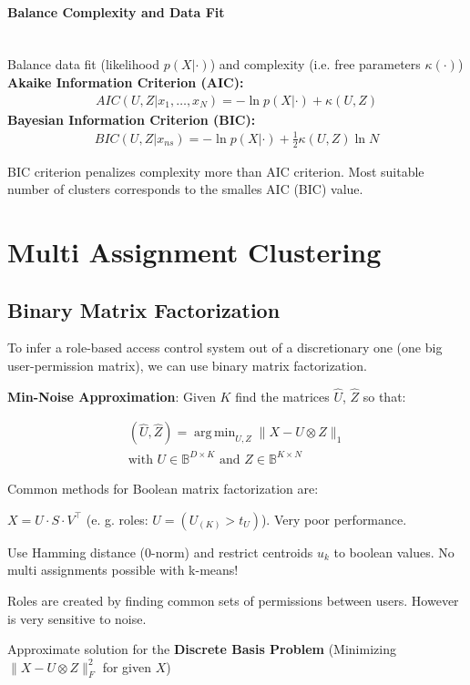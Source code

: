 \documentclass[a4paper,landscape,10pt]{article}
\newlength{\wideitemsep}
\let\olditem\item
\renewcommand{\item}{\setlength{\itemsep}{\wideitemsep}\olditem}
\DeclareMathOperator*{\argmin}{arg\,min}
\begin{document}
\begin{multicols}{4}
\paragraph{Balance Complexity and Data Fit} \hfill \\
Balance data fit (likelihood $p(X|\cdot)$) and complexity (i.e. free parameters
$\kappa(\cdot)$) \\
{\bf Akaike Information Criterion (AIC):}
\begin{align*}
    AIC(U, Z | x_1,\ldots,x_N) = - \ln p(X|\cdot) + \kappa(U, Z)
\end{align*}
{\bf Bayesian Information Criterion (BIC):}
\begin{align*}
  BIC(U, Z | x_{ns}) = - \ln p(X|\cdot) + \frac{1}{2}\kappa(U, Z) \ln
    N
\end{align*}

BIC criterion penalizes complexity more than AIC criterion. Most suitable number
of clusters corresponds to the smalles AIC (BIC) value.

\section{Multi Assignment Clustering}



\subsection{Binary Matrix Factorization}
To infer a role-based access control system out of a discretionary one
(one big user-permission matrix), we can use binary matrix factorization.

{\bf Min-Noise Approximation}: Given $K$ find the matrices $\hat{U}$, $\hat{Z}$
so that:

\begin{equation*}
\begin{split}
    (\hat{U}, \hat{Z}) = \argmin_{U, Z} \| X - U \otimes Z \|_1 \\
    \text{with } U \in \mathbb{B}^{D \times K} \text{ and } Z \in \mathbb{B}^{K
    \times N}
\end{split}
\end{equation*}

Common methods for Boolean matrix factorization are:
\begin{description}
    \item[Rounded SVD] $X = U \cdot S \cdot V^\top$ (e. g. roles: $\hat{U} =
    (U_{(K)} > t_U)$). Very poor performance.
    \item[K-means with Hamming distance] Use Hamming distance (0-norm) and
    restrict centroids $u_k$ to boolean values. No multi assignments possible
    with k-means!
    \item[RoleMiner] Roles are created by finding common sets of permissions
    between users. However is very sensitive to noise.
    \item[DBPsolver] Approximate solution for the {\bf Discrete Basis Problem}
    (Minimizing $\| X - U \otimes Z \|_F^2$ for given $X$)
\end{description}


\end{multicols}
\end{document}
